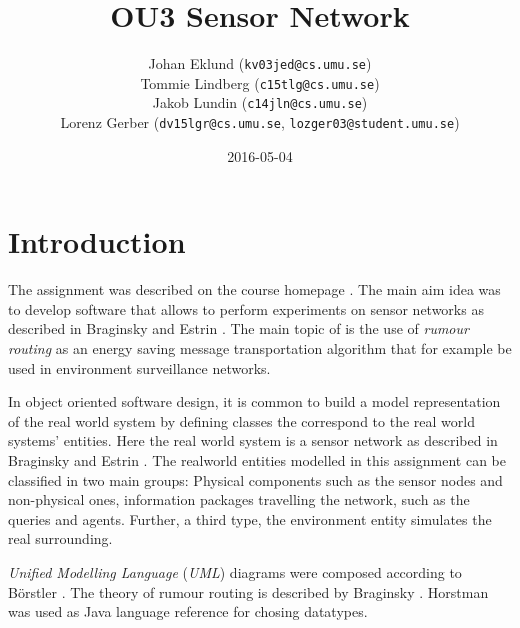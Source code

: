\documentclass[a4paper,11pt,twoside]{article}
\title{OU3 Sensor Network}
\author{Johan Eklund ({\tt{kv03jed@cs.umu.se}}) \\ 
Tommie Lindberg ({\tt{c15tlg@cs.umu.se}}) \\
Jakob Lundin ({\tt{c14jln@cs.umu.se}}) \\
Lorenz Gerber ({\tt{dv15lgr@cs.umu.se}}, {\tt{lozger03@student.umu.se}})
}
\date{2016-05-04}
\begin{document}
\lstset{language=C}
\maketitle
\thispagestyle{empty}
\newpage
\tableofcontents
\thispagestyle{empty}
\newpage

\clearpage
{}

\section{Introduction} 
The assignment was described on the course homepage
\cite{sensornetwork}. The main aim idea was to develop software that
allows to perform experiments on sensor networks as described in
Braginsky and Estrin \cite{braginsky2002}. The main topic of
\cite{braginsky2002} is the use of \textit{rumour routing} as an
energy saving message transportation algorithm that for example
be used in environment surveillance networks.

In object oriented software design, it is common to build 
a model representation of the real world system \cite{roleplay} by
defining classes the correspond to the real world systems' entities.  
Here the real world system is a sensor network as described in
Braginsky and Estrin \cite{braginsky2002}. The realworld entities
modelled in this assignment can be classified in two main groups: Physical
components such as the sensor nodes and non-physical ones, information packages
travelling the network, such as the queries and agents. Further, a third type, 
the environment entity simulates the real surrounding.

\textit{Unified Modelling Language} (\textit{UML}) diagrams were
composed according to Börstler \cite{roleplay}. The theory of rumour
routing is described by Braginsky \cite{braginsky2002}. Horstman was
used as Java language reference \cite{horstman2014} for chosing datatypes.
\end{document}
